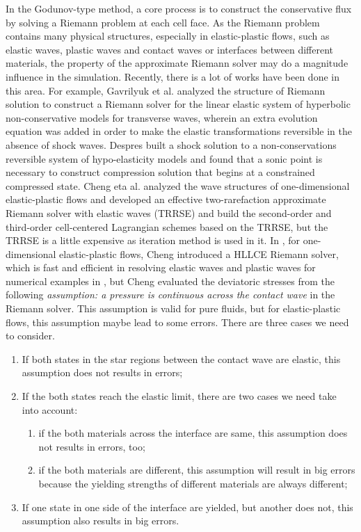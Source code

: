 \documentclass{article}
\numberwithin{equation}{section}
\numberwithin{table}{section}
\begin{document}
In the  Godunov-type method,  a core process is to construct the conservative flux by solving a Riemann problem  at each cell face. As the Riemann problem contains many physical structures, especially in elastic-plastic flows, such as elastic waves, plastic waves and contact waves or interfaces between different materials, the property of the approximate Riemann solver may do a magnitude influence in the simulation. Recently, there is a lot of works have been done in this area. For example, Gavrilyuk et al. \cite{gavrilyuk2008modelling} analyzed the structure of Riemann solution to construct a Riemann solver for the linear elastic system  of hyperbolic non-conservative models for transverse waves, wherein an extra evolution equation was added in order to make the elastic transformations reversible in the absence of shock waves. Despres \cite{despres2007geometrical} built a shock solution to a non-conservations reversible system of hypo-elasticity models and found that a sonic point is necessary to construct compression solution that begins at a constrained compressed state.  Cheng eta al.  \cite{cheng2015high} analyzed the wave structures of one-dimensional elastic-plastic flows and developed an effective two-rarefaction approximate Riemann solver with elastic waves (TRRSE) and build the second-order and third-order cell-centered Lagrangian schemes based on the TRRSE, but the TRRSE is a little  expensive as iteration method is used in it.
In \cite{cheng2016harten}, for one-dimensional elastic-plastic flows, Cheng introduced a HLLCE Riemann solver, which is fast and efficient in resolving elastic waves and plastic waves for numerical examples in \cite{cheng2016harten}, but Cheng evaluated the deviatoric stresses from the following \emph{assumption: a pressure is continuous across the contact wave} in the Riemann solver. This assumption is valid for pure fluids, but for elastic-plastic flows, this assumption maybe lead to some errors. There are three cases we need  to consider.
\begin{enumerate}
  \item If both states in the star regions between the contact wave are elastic, this assumption does not results in errors;
  \item If the both states reach the elastic limit, there are two cases we need take into account:
  \begin{enumerate}
    \item if the both materials across the interface are same, this assumption does not results in errors, too;
    \item if the both materials are different, this assumption will result in big errors because the yielding strengths of different materials are always different;
  \end{enumerate}
  \item If one state in one side of the interface are yielded, but another does not,  this assumption also results in big errors.
\end{enumerate}
\end{document}
